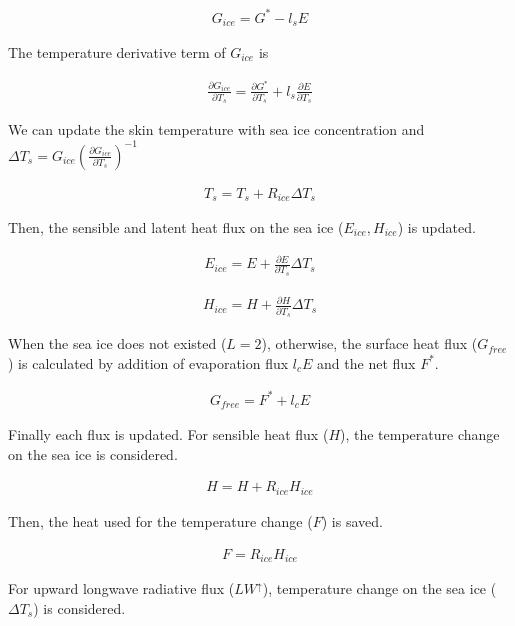 \begin{eqnarray}
    G_{ice} = G^* - l_s E
\end{eqnarray}

The temperature derivative term of \(G_{ice}\) is

\begin{eqnarray}
    \frac{\partial G_{ice}}{\partial T_s}=\frac{\partial G^*}{\partial T_s} + l_s\frac{\partial E}{\partial T_s}
\end{eqnarray}

We can update the skin temperature with sea ice concentration and
\(\Delta T_s=G_{ice} ( \frac{\partial G_{ice}}{\partial T_s})^{-1}\)

\begin{eqnarray}
    T_s = T_s +R_{ice} \Delta T_s
\end{eqnarray}

Then, the sensible and latent heat flux on the sea ice
(\(E_{ice},H_{ice}\)) is updated.

\begin{eqnarray}
    E_{ice} = E + \frac{\partial E}{\partial T_s}\Delta T_s
\end{eqnarray}

\begin{eqnarray}
    H_{ice} = H + \frac{\partial H}{\partial T_s}\Delta T_s
\end{eqnarray}

When the sea ice does not existed (\(L=2\)), otherwise, the surface heat
flux (\(G_{free}\)) is calculated by addition of evaporation flux
\(l_cE\) and the net flux \(F^\ast\).

\begin{eqnarray}
    G_{free}=F^\ast + l_cE
\end{eqnarray}

Finally each flux is updated. For sensible heat flux (\(H\)), the
temperature change on the sea ice is considered.

\begin{eqnarray}
    H=H+ R_{ice}  H_{ice}
\end{eqnarray}

Then, the heat used for the temperature change (\(F\)) is saved.

\begin{eqnarray}
    F = R_{ice} H_{ice}
\end{eqnarray}

For upward longwave radiative flux (\(LW^\uparrow\)), temperature change
on the sea ice (\(\Delta T_s\)) is considered.

